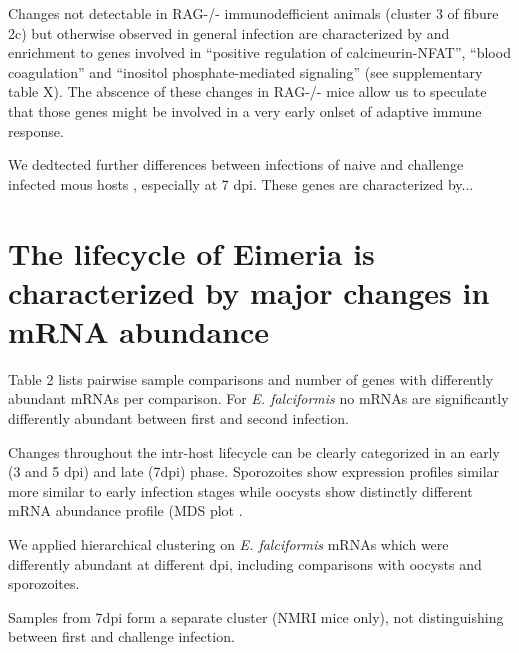 \documentclass{bmcart}
\begin{document}
Changes not detectable in RAG-/- immunodefficient animals (cluster 3
of fibure 2c) but otherwise observed in general infection are
characterized by and enrichment to genes involved in ``positive
regulation of calcineurin-NFAT'', ``blood coagulation'' and ``inositol
phosphate-mediated signaling'' (see supplementary table X). The
abscence of these changes in RAG-/- mice allow us to speculate that
those genes might be involved in a very early onlset of adaptive
immune response.



We dedtected further differences between infections of naive and
challenge infected mous hosts , especially at 7 dpi. These genes are
characterized by...


\section*{The lifecycle of Eimeria is characterized by major changes in mRNA abundance}

Table 2 lists pairwise sample comparisons and number of genes with
differently abundant mRNAs per comparison.  For
\textit{E. falciformis} no mRNAs are significantly differently
abundant between first and second infection.

Changes throughout the intr-host lifecycle can be clearly categorized
in an early (3 and 5 dpi) and late (7dpi) phase. Sporozoites show
expression profiles similar more similar to early infection stages
while oocysts show distinctly different mRNA abundance profile (MDS
plot .

We applied hierarchical clustering on \textit{E. falciformis} mRNAs
which were differently abundant at different dpi, including
comparisons with oocysts and sporozoites.

Samples from 7dpi form a separate cluster (NMRI mice only), not
distinguishing between first and challenge infection.



\end{document}

